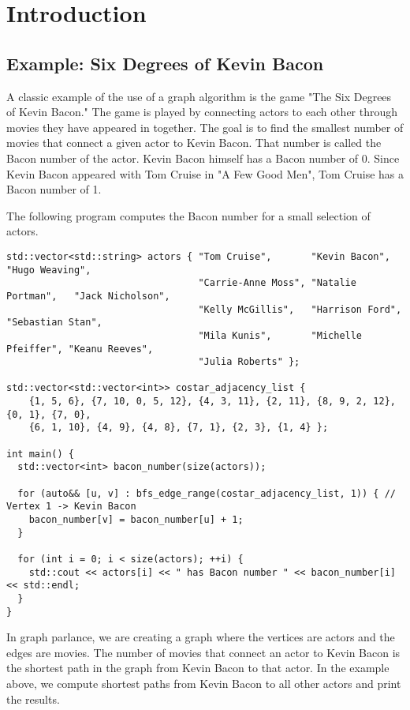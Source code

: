 
\chapter{Introduction}

\section{Example: Six Degrees of Kevin Bacon}

A classic example of the use of a graph algorithm is the game "The Six Degrees of Kevin Bacon."
The game is played by connecting actors to each other through movies they have appeared in together.
The goal is to find the smallest number of movies that connect a given actor to Kevin Bacon.
That number is called the Bacon number of the actor.  Kevin Bacon himself has a Bacon number of 0.
Since Kevin Bacon appeared with Tom Cruise in "A Few Good Men", Tom Cruise has a Bacon number of 1.

The following program computes the Bacon number for a small selection of actors.
{\small
\begin{lstlisting}
std::vector<std::string> actors { "Tom Cruise",       "Kevin Bacon",       "Hugo Weaving",
                                  "Carrie-Anne Moss", "Natalie Portman",   "Jack Nicholson",
                                  "Kelly McGillis",   "Harrison Ford",     "Sebastian Stan",
                                  "Mila Kunis",       "Michelle Pfeiffer", "Keanu Reeves",
                                  "Julia Roberts" };

std::vector<std::vector<int>> costar_adjacency_list {
    {1, 5, 6}, {7, 10, 0, 5, 12}, {4, 3, 11}, {2, 11}, {8, 9, 2, 12}, {0, 1}, {7, 0},
    {6, 1, 10}, {4, 9}, {4, 8}, {7, 1}, {2, 3}, {1, 4} };

int main() {
  std::vector<int> bacon_number(size(actors));

  for (auto&& [u, v] : bfs_edge_range(costar_adjacency_list, 1)) { // Vertex 1 -> Kevin Bacon
    bacon_number[v] = bacon_number[u] + 1;
  }

  for (int i = 0; i < size(actors); ++i) {
    std::cout << actors[i] << " has Bacon number " << bacon_number[i] << std::endl;
  }
}
\end{lstlisting}
}

In graph parlance, we are creating a graph where the vertices are actors and the edges are movies.
The number of movies that connect an actor to Kevin Bacon is the shortest path in the graph
from Kevin Bacon to that actor.  In the example above, we compute shortest paths from Kevin
Bacon to all other actors and print the results.



